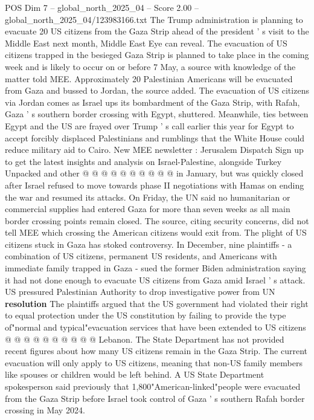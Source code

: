 \begin{textsample}{POS Dim 7 – global\_north\_2025\_04 – Score 2.00 – global\_north\_2025\_04/123983166.txt}  \label{ex:f7_pos_350}
The Trump administration is planning to evacuate 20 US citizens from the Gaza Strip ahead of the president ' s visit to the Middle East next month, Middle East Eye can reveal.
The evacuation of US citizens trapped in the besieged Gaza Strip is planned to take place in the coming week and is likely to occur on or before 7 May, a source with knowledge of the matter told MEE.
Approximately 20 Palestinian Americans will be evacuated from Gaza and bussed to Jordan, the source added.
The evacuation of US citizens via Jordan comes as Israel ups its bombardment of the Gaza Strip, with Rafah, Gaza ' s southern border crossing with Egypt, shuttered.
Meanwhile, ties between Egypt and the US are frayed over Trump ' s call earlier this year for Egypt to accept forcibly displaced Palestinians and rumblings that the White House could reduce military aid to Cairo.
New MEE newsletter : Jerusalem Dispatch Sign up to get the latest insights and analysis on Israel-Palestine, alongside Turkey Unpacked and other @ @ @ @ @ @ @ @ @ @ in January, but was quickly closed after Israel refused to move towards phase II negotiations with Hamas on ending the war and resumed its attacks.
On Friday, the UN said no humanitarian or commercial supplies had entered Gaza for more than seven weeks as all main border crossing points remain closed.
The source, citing security concerns, did not tell MEE which crossing the American citizens would exit from.
The plight of US citizens stuck in Gaza has stoked controversy.
In December, nine plaintiffs - a combination of US citizens, permanent US residents, and Americans with immediate family trapped in Gaza - sued the former Biden administration saying it had not done enough to evacuate US citizens from Gaza amid Israel ' s attack.
US pressured Palestinian Authority to drop investigative power from UN \textbf{resolution} The plaintiffs argued that the US government had violated their right to equal protection under the US constitution by failing to provide the type of"normal and typical"evacuation services that have been extended to US citizens @ @ @ @ @ @ @ @ @ @ Lebanon.
The State Department has not provided recent figures about how many US citizens remain in the Gaza Strip.
The current evacuation will only apply to US citizens, meaning that non-US family members like spouses or children would be left behind.
A US State Department spokesperson said previously that 1,800"American-linked"people were evacuated from the Gaza Strip before Israel took control of Gaza ' s southern Rafah border crossing in May 2024.

\end{textsample}
